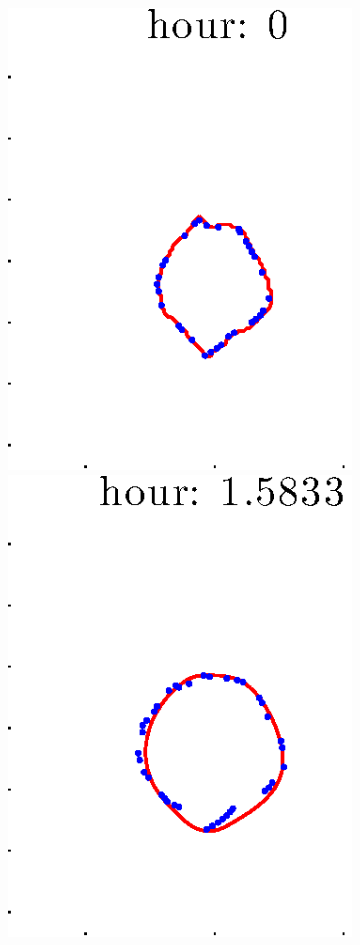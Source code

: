 \documentclass[12pt]{article}
\begin{document}
\begin{figure}[h!]
\begin{subfigure}[b]{.3\textwidth}
	\end{subfigure}
	\begin{subfigure}[b]{.3\textwidth}
	\centering
		\includegraphics[height=.15\textheight]{Pos14exp8/full/first1.eps}
		\includegraphics[height=.15\textheight]{Pos14exp8/full/first2.eps}

\end{subfigure}
\end{figure}
\end{document}
